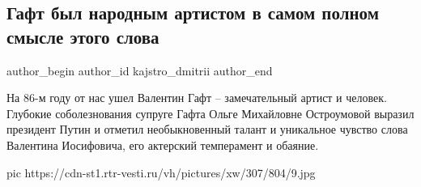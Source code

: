  
 
 
 
 
 
\subsection{Гафт был народным артистом в самом полном смысле этого слова}
\label{sec:12_12_2020.news.ru.vesti.kajstro_dmitrii.1.death_valentin_gaft}
\ifcmt
	author_begin
   author_id kajstro_dmitrii
	author_end
\fi

На 86-м году от нас ушел Валентин Гафт – замечательный артист и человек.
Глубокие соболезнования супруге Гафта Ольге Михайловне Остроумовой выразил
президент Путин и отметил необыкновенный талант и уникальное чувство слова
Валентина Иосифовича, его актерский темперамент и обаяние. 

\ifcmt
pic https://cdn-st1.rtr-vesti.ru/vh/pictures/xw/307/804/9.jpg
\fi
